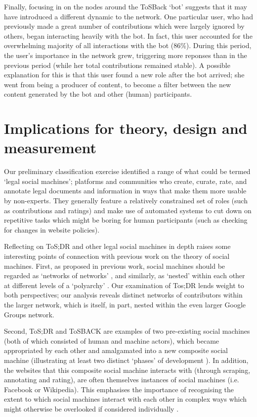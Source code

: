 \documentclass{sig-alternate}
\begin{document}
Finally, focusing in on the nodes around the ToSBack `bot' suggests that it may have introduced a different dynamic to the network. One particular user, who had previously made a great number of contributions which were largely ignored by others, began interacting heavily with the bot. In fact, this user accounted for the overwhelming majority of all interactions with the bot (86\%). During this period, the user's importance in the network grew, triggering more reponses than in the previous period (while her total contributions remained stable). A possible explanation for this is that this user found a new role after the bot arrived; she went from being a producer of content, to become a filter between the new content generated by the bot and other (human) participants.

\section{Implications for theory, design and measurement}

Our preliminary classification exercise identified a range of what could be termed `legal social machines'; platforms and communities who create, curate, rate, and annotate legal documents and information in ways that make them more usable by non-experts. They generally feature a relatively constrained set of roles (such as contributions and ratings) and make use of automated systems to cut down on repetitive tasks which might be boring for human participants (such as checking for changes in website policies).

Reflecting on ToS;DR and other legal social machines in depth raises some interesting points of connection with previous work on the theory of social machines. First, as proposed in previous work, social machines should be regarded as `networks of networks' \cite{tinati:htp}, and similarly, as `nested' within each other at different levels of a `polyarchy' \cite{shadbolt:classif}. Our examination of Tos;DR lends weight to both perspectives; our analysis reveals distinct networks of contributors within the larger network, which is itself, in part, nested within the even larger Google Groups network.

Second, ToS;DR and ToSBACK are examples of two pre-existing social machines (both of which consisted of human and machine actors), which became appropriated by each other and amalgamated into a new composite social machine (illustrating at least two distinct `phases' of development \cite{tinati:htp}). In addition, the websites that this composite social machine interacts with (through scraping, annotating and rating), are often themselves instances of social machines (i.e. Facebook or Wikipedia). This emphasises the importance of recognising the extent to which social machines interact with each other in complex ways which might otherwise be overlooked if considered individually \cite{deroure:obs}.
\end{document}
